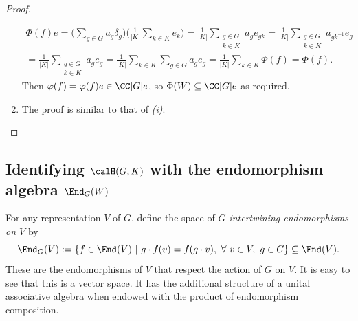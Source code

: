 \documentclass[11pt]{amsart}
\theoremstyle{remark}
\begin{document}
\begin{proof}
\begin{enumerate}[\itshape(i)]
		      \begin{multline*}
			      \Phi(f)e = \bigg(\sum_{g\in G} a_g\delta_g\bigg)\bigg(\frac{1}{|K|}\sum_{k\in K} e_k\bigg) = \frac{1}{|K|} \sum_{\substack{g\in G \\ k\in K}} a_g e_{gk} = \frac{1}{|K|} \sum_{\substack{g\in G \\ k\in K}} a_{gk^{-1}} e_g \\
			      = \frac{1}{|K|} \sum_{\substack{g\in G \\ k\in K}} a_g e_g = \frac{1}{|K|}\sum_{k\in K}\sum_{g\in G} a_ge_g = \frac{1}{|K|}\sum_{k\in K} \Phi(f) = \Phi(f).
		      \end{multline*}
		      Then $\varphi(f)=\varphi(f)e\in\CC[G]e$, so $\Phi(W)\subseteq \CC[G]e$ as required.

		\item The proof is similar to that of {\itshape(i)}.\qedhere
	\end{enumerate}
\end{proof}


\subsection{Identifying $\calH(G,K)$ with the endomorphism algebra $\End_G(W)$}\label{Section1.5}
For any representation $V$ of $G$, define the space of \emph{$G$-intertwining endomorphisms on $V$} by
\[
	\End_G(V) := \{ f\in\End(V)\ |\ g\cdot f(v) = f(g\cdot v),\ \forall\ v\in V,\ g\in G \}\subseteq \End(V).
\]
These are the endomorphisms of $V$ that respect the action of $G$ on $V$.
It is easy to see that this is a vector space.
It has the additional structure of a unital associative algebra when endowed with the product of endomorphism composition.
\end{document}

